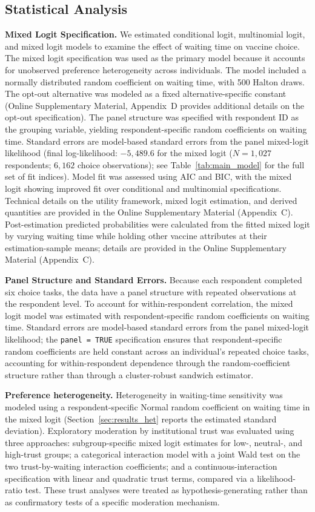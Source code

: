 \documentclass[12pt]{article}
\begin{document}
\subsection{Statistical Analysis}

\textbf{Mixed Logit Specification.} We estimated conditional logit, multinomial logit, and mixed logit models to examine the effect of waiting time on vaccine choice. The mixed logit specification was used as the primary model because it accounts for unobserved preference heterogeneity across individuals. The model included a normally distributed random coefficient on waiting time, with 500 Halton draws. The opt-out alternative was modeled as a fixed alternative-specific constant (Online Supplementary Material, Appendix~D provides additional details on the opt-out specification). The panel structure was specified with respondent ID as the grouping variable, yielding respondent-specific random coefficients on waiting time. Standard errors are model-based standard errors from the panel mixed-logit likelihood (final log-likelihood: $-5{,}489.6$ for the mixed logit ($N = 1{,}027$ respondents; $6{,}162$ choice observations); see Table~\ref{tab:main_model} for the full set of fit indices). Model fit was assessed using AIC and BIC, with the mixed logit showing improved fit over conditional and multinomial specifications. Technical details on the utility framework, mixed logit estimation, and derived quantities are provided in the Online Supplementary Material (Appendix~C). Post-estimation predicted probabilities were calculated from the fitted mixed logit by varying waiting time while holding other vaccine attributes at their estimation-sample means; details are provided in the Online Supplementary Material (Appendix~C).

\textbf{Panel Structure and Standard Errors.} Because each respondent completed six choice tasks, the data have a panel structure with repeated observations at the respondent level. To account for within-respondent correlation, the mixed logit model was estimated with respondent-specific random coefficients on waiting time. Standard errors are model-based standard errors from the panel mixed-logit likelihood; the \texttt{panel = TRUE} specification ensures that respondent-specific random coefficients are held constant across an individual's repeated choice tasks, accounting for within-respondent dependence through the random-coefficient structure rather than through a cluster-robust sandwich estimator.

\textbf{Preference heterogeneity.} Heterogeneity in waiting-time sensitivity was modeled using a respondent-specific Normal random coefficient on waiting time in the mixed logit (Section~\ref{sec:results_het} reports the estimated standard deviation). Exploratory moderation by institutional trust was evaluated using three approaches: subgroup-specific mixed logit estimates for low-, neutral-, and high-trust groups; a categorical interaction model with a joint Wald test on the two trust-by-waiting interaction coefficients; and a continuous-interaction specification with linear and quadratic trust terms, compared via a likelihood-ratio test. These trust analyses were treated as hypothesis-generating rather than as confirmatory tests of a specific moderation mechanism.
\end{document}
